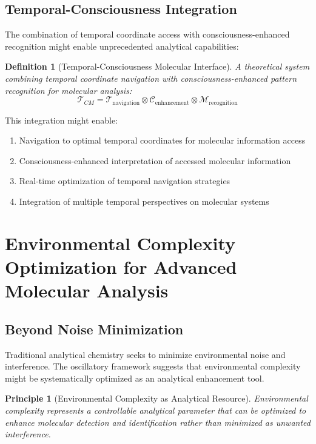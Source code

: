\documentclass[11pt,a4paper]{article}
\newtheorem{definition}[theorem]{Definition}
\newtheorem{principle}[theorem]{Principle}
\theoremstyle{remark}
\begin{document}
\subsection{Temporal-Consciousness Integration}

The combination of temporal coordinate access with consciousness-enhanced recognition might enable unprecedented analytical capabilities:

\begin{definition}[Temporal-Consciousness Molecular Interface]
A theoretical system combining temporal coordinate navigation with consciousness-enhanced pattern recognition for molecular analysis:
$$\mathcal{T}_{CM} = \mathcal{T}_{\text{navigation}} \otimes \mathcal{C}_{\text{enhancement}} \otimes \mathcal{M}_{\text{recognition}}$$
\end{definition}

This integration might enable:
\begin{enumerate}
\item Navigation to optimal temporal coordinates for molecular information access
\item Consciousness-enhanced interpretation of accessed molecular information
\item Real-time optimization of temporal navigation strategies
\item Integration of multiple temporal perspectives on molecular systems
\end{enumerate}

\section{Environmental Complexity Optimization for Advanced Molecular Analysis}

\subsection{Beyond Noise Minimization}

Traditional analytical chemistry seeks to minimize environmental noise and interference. The oscillatory framework suggests that environmental complexity might be systematically optimized as an analytical enhancement tool.

\begin{principle}[Environmental Complexity as Analytical Resource]
Environmental complexity represents a controllable analytical parameter that can be optimized to enhance molecular detection and identification rather than minimized as unwanted interference.
\end{principle}
\end{document}
